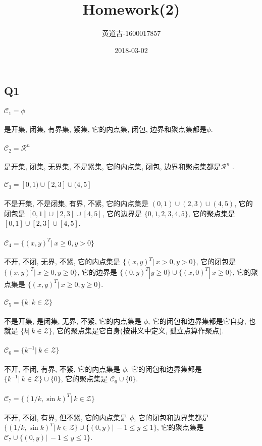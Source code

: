 \documentclass{article}
\title{Homework(2)}
\date{2018-03-02}
\author{
  \begin{CJK}{UTF8}{gbsn}
    黄道吉-1600017857
  \end{CJK}
}
\begin{document}
\begin{CJK}{UTF8}{gbsn}
\section{Q1}
  \paragraph{$\mathcal{C}_1 = \phi$}
    是开集, 闭集, 有界集, 紧集, 它的内点集, 闭包, 边界和聚点集都是$\phi$.
  \paragraph{$\mathcal{C}_2 = \mathcal{R}^n$}
    是开集, 闭集, 无界集, 不是紧集, 它的内点集, 闭包, 边界和聚点集都是$\mathcal{R}^n$ .
  \paragraph{$\mathcal{C}_3 = [0, 1) \cup [2, 3] \cup (4, 5]$}
    不是开集, 不是闭集, 有界, 不紧, 它的内点集是 $(0, 1) \cup (2, 3) \cup (4, 5)$, 它的闭包是 $[0, 1] \cup [2, 3] \cup [4, 5]$, 它的边界是 $\{0, 1, 2, 3, 4, 5\}$, 它的聚点集是 $[0, 1] \cup [2, 3] \cup [4, 5]$.
  \paragraph{$\mathcal{C}_4 = \{(x, y)^T |\  x \geq 0, y > 0\}$}
    不开, 不闭, 无界, 不紧, 它的内点集是 $\{(x, y)^T|\ x > 0, y > 0\}$, 它的闭包是 $\{(x, y)^T|\ x \ge 0, y \ge 0\}$, 它的边界是 $\{(0, y)^T|y \ge 0 \} \cup \{(x, 0)^T|\ x \ge 0\}$, 它的聚点集是 $\{(x, y)^T|\ x \ge 0, y \ge 0\}$.
  \paragraph{$\mathcal{C}_5 = \{k|\ k \in \mathcal{Z}\}$}
    不是开集, 是闭集, 无界, 不紧, 它的内点集是 $\phi$, 它的闭包和边界集都是它自身, 也就是 $\{k|\ k \in \mathcal{Z}\}$, 它的聚点集是它自身(按讲义中定义, 孤立点算作聚点).
  \paragraph{$\mathcal{C}_6 = \{k^{-1}|\ k \in \mathcal{Z}\}$}
    不开, 不闭, 有界, 不紧, 它的内点集是 $\phi$, 它的闭包和边界集都是 $\{k^{-1}|\ k \in \mathcal{Z}\} \cup \{0\}$, 它的聚点集是 $\mathcal{C}_6 \cup \{0\}$.
  \paragraph{$\mathcal{C}_7 = \{(1 / k, \sin{k})^T|\ k \in \mathcal{Z}\}$}
    不开, 不闭, 有界, 但不紧, 它的内点集是 $\phi$, 它的闭包和边界集都是 $\{(1 / k, \sin{k})^T|\ k \in \mathcal{Z}\} \cup \{(0, y)|\ -1 \leq y \leq 1\}$, 它的聚点集是 $\mathcal{C}_7 \cup \{(0, y)|\ -1 \leq y \leq 1\}$.


\end{CJK}
\end{document}
